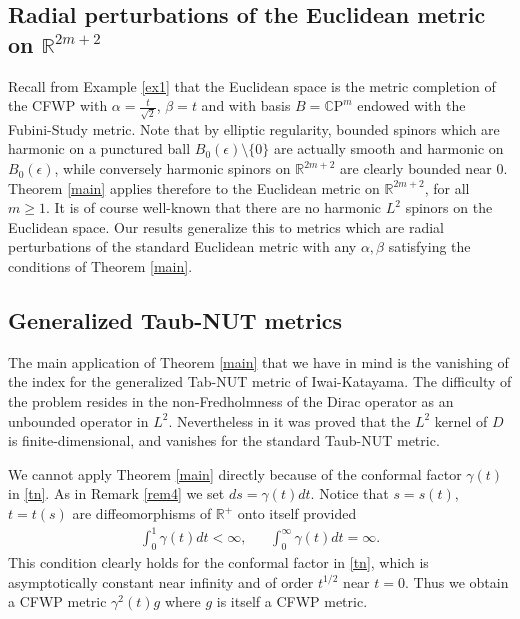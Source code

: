 \documentclass[12pt]{amsart}
\begin{document}
\subsection{Radial perturbations of the Euclidean metric on ${{\mathbb R}}^{2m+2}$}
Recall from Example \ref{ex1} that the Euclidean space
is the metric completion of the CFWP with $\alpha=\frac{t}{\sqrt{2}}$, $\beta=t$
and with basis $B={{\mathbb C}} {\mathrm{P}}^m$ endowed with the Fubini-Study metric.
Note that by elliptic regularity, bounded spinors 
which are harmonic on a punctured ball $B_0(\epsilon)\setminus \{0\}$ are 
actually smooth and harmonic on $B_0(\epsilon)$, while conversely 
harmonic spinors on ${{\mathbb R}}^{2m+2}$ are clearly bounded near $0$.
Theorem \ref{main} applies therefore to the Euclidean metric on 
${{\mathbb R}}^{2m+2}$, for all $m\ge 1$. It is of course well-known that there are 
no harmonic $L^2$ spinors on the Euclidean space. Our results generalize 
this to metrics which are radial perturbations of the standard Euclidean 
metric with any $\alpha,\beta$ satisfying the conditions 
of Theorem \ref{main}. 

\subsection{Generalized Taub-NUT metrics}
The main application of Theorem \ref{main} that we have in mind is the 
vanishing of the index for the generalized Tab-NUT metric of Iwai-Katayama.
The difficulty of the problem resides in the non-Fredholmness of the Dirac 
operator as an 
unbounded operator in $L^2$. Nevertheless in \cite{MV} it was proved 
that the $L^2$ kernel of $D$ is finite-dimensional, and vanishes for the 
standard Taub-NUT metric. 

We cannot apply Theorem \ref{main} directly because of the conformal factor
$\gamma(t)$ in \eqref{tn}. As in Remark \ref{rem4} we set $ds=\gamma(t)dt$. 
Notice that $s=s(t)$, $t=t(s)$ are diffeomorphisms of ${{\mathbb R}}^+$ onto itself 
provided 
\begin{align}\label{int}
\int_0^1\gamma(t)dt<\infty,&&\int_0^\infty \gamma(t)dt=\infty.
\end{align}
This condition clearly holds for the conformal factor in \eqref{tn}, which is 
asymptotically constant near infinity and of order $t^{1/2}$ near $t=0$.
Thus we obtain a CFWP metric $\gamma^2(t) g$ where $g$ is itself a CFWP metric. 
\end{document}
